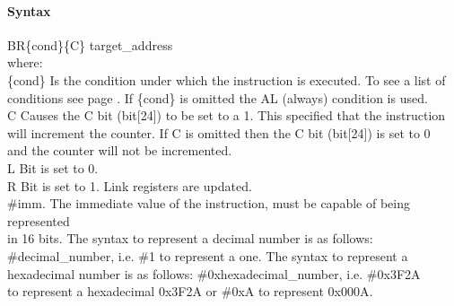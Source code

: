 \documentclass[12pt]{article}
\begin{document}
    \paragraph{Syntax}
    \begin{flushleft}
    BR\{cond\}\{C\} target\_address\\%
    \vspace{1em}        %
    where:\\
    \vspace{1em}
    \{cond\}    \hspace{2em} Is the condition under which the instruction is executed. To see a list of\\
                \hspace{5.4em} conditions see page . If \{cond\} is omitted the AL (always) condition is used.\\
    \vspace{1em}
    C       \hspace{4.5em} Causes the C bit (bit[24]) to be set to a 1. This specified that the instruction\\
            \hspace{5.4em} will increment the counter. If C is omitted then the C bit (bit[24]) is set to 0\\
            \hspace{5.4em} and the counter will not be incremented.\\
    \vspace{1em}
    L       \hspace{4.5em} Bit is set to 0.\\
    \vspace{1em}
    R       \hspace{4.5em} Bit is set to 1. Link registers are updated.\\
    \vspace{1em}
    \#imm.  \hspace{1.8em} The immediate value of the instruction, must be capable of being represented\\              \hspace{5.4em} in 16 bits. The syntax to represent a decimal number is as follows:\\
            \hspace{5.4em} \#decimal\_number, i.e. \#1 to represent a one. The syntax to represent a\\
            \hspace{5.4em} hexadecimal number is as follows: \#0xhexadecimal\_number, i.e. \#0x3F2A \\
            \hspace{5.4em} to represent a hexadecimal 0x3F2A or \#0xA to represent 0x000A.\\
    \end{flushleft}
    
\end{document}
